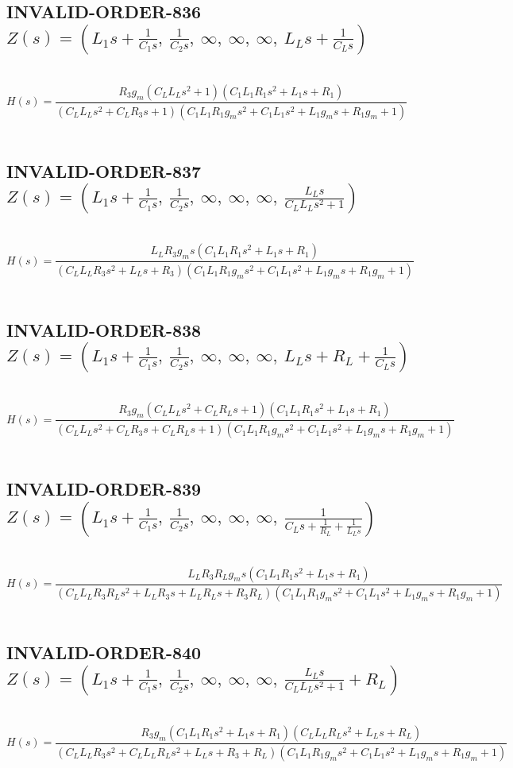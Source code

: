 \documentclass{article}
\begin{document}
\subsection{INVALID-ORDER-836 $Z(s) = \left( L_{1} s + \frac{1}{C_{1} s}, \  \frac{1}{C_{2} s}, \  \infty, \  \infty, \  \infty, \  L_{L} s + \frac{1}{C_{L} s}\right)$ } \ 
\textbf{\[H(s) = \frac{R_{3} g_{m} \left(C_{L} L_{L} s^{2} + 1\right) \left(C_{1} L_{1} R_{1} s^{2} + L_{1} s + R_{1}\right)}{\left(C_{L} L_{L} s^{2} + C_{L} R_{3} s + 1\right) \left(C_{1} L_{1} R_{1} g_{m} s^{2} + C_{1} L_{1} s^{2} + L_{1} g_{m} s + R_{1} g_{m} + 1\right)}\] } \ 
\subsection{INVALID-ORDER-837 $Z(s) = \left( L_{1} s + \frac{1}{C_{1} s}, \  \frac{1}{C_{2} s}, \  \infty, \  \infty, \  \infty, \  \frac{L_{L} s}{C_{L} L_{L} s^{2} + 1}\right)$ } \ 
\textbf{\[H(s) = \frac{L_{L} R_{3} g_{m} s \left(C_{1} L_{1} R_{1} s^{2} + L_{1} s + R_{1}\right)}{\left(C_{L} L_{L} R_{3} s^{2} + L_{L} s + R_{3}\right) \left(C_{1} L_{1} R_{1} g_{m} s^{2} + C_{1} L_{1} s^{2} + L_{1} g_{m} s + R_{1} g_{m} + 1\right)}\] } \ 
\subsection{INVALID-ORDER-838 $Z(s) = \left( L_{1} s + \frac{1}{C_{1} s}, \  \frac{1}{C_{2} s}, \  \infty, \  \infty, \  \infty, \  L_{L} s + R_{L} + \frac{1}{C_{L} s}\right)$ } \ 
\textbf{\[H(s) = \frac{R_{3} g_{m} \left(C_{L} L_{L} s^{2} + C_{L} R_{L} s + 1\right) \left(C_{1} L_{1} R_{1} s^{2} + L_{1} s + R_{1}\right)}{\left(C_{L} L_{L} s^{2} + C_{L} R_{3} s + C_{L} R_{L} s + 1\right) \left(C_{1} L_{1} R_{1} g_{m} s^{2} + C_{1} L_{1} s^{2} + L_{1} g_{m} s + R_{1} g_{m} + 1\right)}\] } \ 
\subsection{INVALID-ORDER-839 $Z(s) = \left( L_{1} s + \frac{1}{C_{1} s}, \  \frac{1}{C_{2} s}, \  \infty, \  \infty, \  \infty, \  \frac{1}{C_{L} s + \frac{1}{R_{L}} + \frac{1}{L_{L} s}}\right)$ } \ 
\textbf{\[H(s) = \frac{L_{L} R_{3} R_{L} g_{m} s \left(C_{1} L_{1} R_{1} s^{2} + L_{1} s + R_{1}\right)}{\left(C_{L} L_{L} R_{3} R_{L} s^{2} + L_{L} R_{3} s + L_{L} R_{L} s + R_{3} R_{L}\right) \left(C_{1} L_{1} R_{1} g_{m} s^{2} + C_{1} L_{1} s^{2} + L_{1} g_{m} s + R_{1} g_{m} + 1\right)}\] } \ 
\subsection{INVALID-ORDER-840 $Z(s) = \left( L_{1} s + \frac{1}{C_{1} s}, \  \frac{1}{C_{2} s}, \  \infty, \  \infty, \  \infty, \  \frac{L_{L} s}{C_{L} L_{L} s^{2} + 1} + R_{L}\right)$ } \ 
\textbf{\[H(s) = \frac{R_{3} g_{m} \left(C_{1} L_{1} R_{1} s^{2} + L_{1} s + R_{1}\right) \left(C_{L} L_{L} R_{L} s^{2} + L_{L} s + R_{L}\right)}{\left(C_{L} L_{L} R_{3} s^{2} + C_{L} L_{L} R_{L} s^{2} + L_{L} s + R_{3} + R_{L}\right) \left(C_{1} L_{1} R_{1} g_{m} s^{2} + C_{1} L_{1} s^{2} + L_{1} g_{m} s + R_{1} g_{m} + 1\right)}\] } \ 
\end{document}
